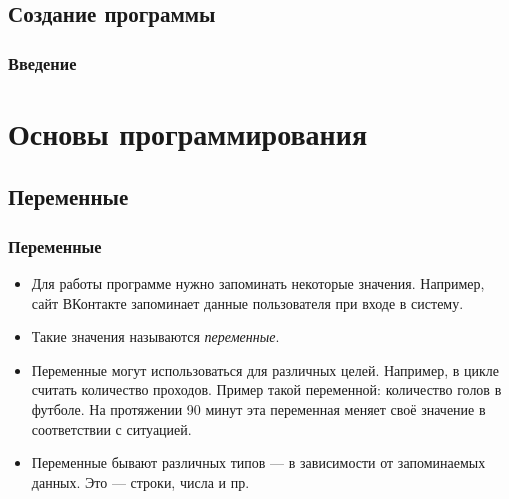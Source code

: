 \documentclass[compress,red]{beamer}
\begin{document}
\subsection{Создание программы}
\begin{frame}
\frametitle{Введение}
		
		\begin{figure}
    \centering
    \end{figure}
    
\end{frame}

\section{Основы программирования}
\subsection{Переменные}
\begin{frame}
  \frametitle{Переменные}
  \begin{itemize}
	\item Для работы программе нужно запоминать некоторые значения. Например, сайт ВКонтакте запоминает данные пользователя при входе в систему. 
	\item Такие значения называются \emph{переменные}.
	\item Переменные могут использоваться для различных целей. Например, в цикле считать количество проходов. Пример такой переменной: количество голов в футболе. На протяжении 90 минут эта переменная меняет своё значение в соответствии с ситуацией.
	\item Переменные бывают различных типов --- в зависимости от запоминаемых данных. Это --- строки, числа и пр.
	\end{itemize}
\end{frame}
\end{document}
